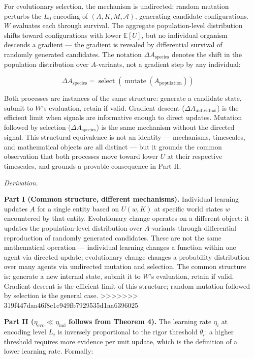 \documentclass[
]{article}
\begin{document}
For evolutionary selection, the mechanism is undirected: random mutation
perturbs the \(L_0\) encoding of \((A, K, M, \mathcal{A})\), generating
candidate configurations. \(W\) evaluates each through survival. The
aggregate population-level distribution shifts toward configurations
with lower \(\mathbb{E}[U]\), but no individual organism descends a
gradient --- the gradient is revealed by differential survival of
randomly generated candidates. The notation
\(\Delta A_{\text{species}}\) denotes the shift in the population
distribution over \(A\)-variants, not a gradient step by any individual:

\[\Delta A_{\text{species}} = \operatorname{select}(\operatorname{mutate}(A_{\text{population}}))\]

Both processes are instances of the same structure: generate a candidate
state, submit to \(W\)'s evaluation, retain if valid. Gradient descent
(\(\Delta A_{\text{individual}}\)) is the efficient limit when signals
are informative enough to direct updates. Mutation followed by selection
(\(\Delta A_{\text{species}}\)) is the same mechanism without the
directed signal. This structural equivalence is not an identity ---
mechanisms, timescales, and mathematical objects are all distinct ---
but it grounds the common observation that both processes move toward
lower \(U\) at their respective timescales, and grounds a provable
consequence in Part II.

\emph{Derivation.}

\textbf{Part I (Common structure, different mechanisms).} Individual
learning updates \(A\) for a single entity based on \(U(w, K)\) at
specific world states \(w\) encountered by that entity. Evolutionary
change operates on a different object: it updates the population-level
distribution over \(A\)-variants through differential reproduction of
randomly generated candidates. These are not the same mathematical
operation --- individual learning changes a function within one agent
via directed update; evolutionary change changes a probability
distribution over many agents via undirected mutation and selection. The
common structure is: generate a new internal state, submit it to \(W\)'s
evaluation, retain if valid. Gradient descent is the efficient limit of
this structure; random mutation followed by selection is the general
case.
>>>>>>> 319f447daa46f8c1e949fb7929535d1aa6396025

\textbf{Part II (\(\eta_{\text{evo}} \ll \eta_{\text{ind}}\) follows
from Theorem 4).} The learning rate \(\eta_i\) at encoding level \(L_i\)
is inversely proportional to the rigor threshold \(\theta_i\): a higher
threshold requires more evidence per unit update, which is the
definition of a lower learning rate. Formally:
\end{document}
